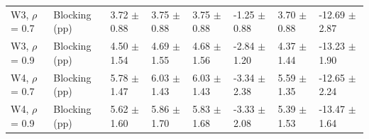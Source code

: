 \begin{table}[t]
\begin{tabular}{llllllll}
W3, $\rho$ = 0.7 & Blocking (pp) & 3.72 $\pm$ 0.88 & 3.75 $\pm$ 0.88 & 3.75 $\pm$ 0.88 & -1.25 $\pm$ 0.88 & 3.70 $\pm$ 0.88 & -12.69 $\pm$ 2.87 \\
W3, $\rho$ = 0.9 & Blocking (pp) & 4.50 $\pm$ 1.54 & 4.69 $\pm$ 1.55 & 4.68 $\pm$ 1.56 & -2.84 $\pm$ 1.20 & 4.37 $\pm$ 1.44 & -13.23 $\pm$ 1.90 \\
W4, $\rho$ = 0.7 & Blocking (pp) & 5.78 $\pm$ 1.47 & 6.03 $\pm$ 1.43 & 6.03 $\pm$ 1.43 & -3.34 $\pm$ 2.38 & 5.59 $\pm$ 1.35 & -12.65 $\pm$ 2.24 \\
W4, $\rho$ = 0.9 & Blocking (pp) & 5.62 $\pm$ 1.60 & 5.86 $\pm$ 1.70 & 5.83 $\pm$ 1.68 & -3.33 $\pm$ 2.08 & 5.39 $\pm$ 1.53 & -13.47 $\pm$ 1.64 \\
\bottomrule
\end{tabular}
\end{table}
